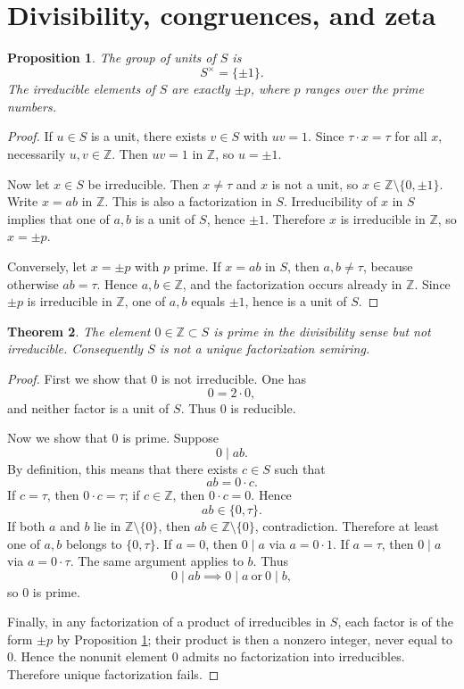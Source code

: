\documentclass[11pt]{article}
\newtheorem{theorem}{Theorem}[section]
\newtheorem{proposition}[theorem]{Proposition}
\theoremstyle{definition}
\newcommand{\Z}{\mathbb Z}
\newcommand{\taup}{\tau}
\begin{document}
\section{Divisibility, congruences, and zeta}

\begin{proposition}\label{prop:units-irr}
The group of units of \(S\) is
\[
S^{\times}=\{\pm 1\}.
\]
The irreducible elements of \(S\) are exactly \(\pm p\), where \(p\) ranges over the prime numbers.
\end{proposition}

\begin{proof}
If \(u\in S\) is a unit, there exists \(v\in S\) with \(uv=1\).  Since \(\taup\cdot x=\taup\) for all \(x\), necessarily \(u,v\in\Z\).  Then \(uv=1\) in \(\Z\), so \(u=\pm1\).

Now let \(x\in S\) be irreducible.  Then \(x\neq \taup\) and \(x\) is not a unit, so \(x\in\Z\setminus\{0,\pm1\}\).  Write \(x=ab\) in \(\Z\).  This is also a factorization in \(S\).  Irreducibility of \(x\) in \(S\) implies that one of \(a,b\) is a unit of \(S\), hence \(\pm1\).  Therefore \(x\) is irreducible in \(\Z\), so \(x=\pm p\).

Conversely, let \(x=\pm p\) with \(p\) prime.  If \(x=ab\) in \(S\), then \(a,b\neq \taup\), because otherwise \(ab=\taup\).  Hence \(a,b\in\Z\), and the factorization occurs already in \(\Z\).  Since \(\pm p\) is irreducible in \(\Z\), one of \(a,b\) equals \(\pm1\), hence is a unit of \(S\).
\end{proof}

\begin{theorem}\label{thm:zero-prime-not-irr}
The element \(0\in\Z\subset S\) is prime in the divisibility sense but not irreducible.  Consequently \(S\) is not a unique factorization semiring.
\end{theorem}

\begin{proof}
First we show that \(0\) is not irreducible.  One has
\[
0=2\cdot 0,
\]
and neither factor is a unit of \(S\).  Thus \(0\) is reducible.

Now we show that \(0\) is prime.  Suppose
\[
0\mid ab.
\]
By definition, this means that there exists \(c\in S\) such that
\[
ab=0\cdot c.
\]
If \(c=\taup\), then \(0\cdot c=\taup\); if \(c\in\Z\), then \(0\cdot c=0\).  Hence
\[
ab\in\{0,\taup\}.
\]
If both \(a\) and \(b\) lie in \(\Z\setminus\{0\}\), then \(ab\in\Z\setminus\{0\}\), contradiction.  Therefore at least one of \(a,b\) belongs to \(\{0,\taup\}\).  If \(a=0\), then \(0\mid a\) via \(a=0\cdot 1\).  If \(a=\taup\), then \(0\mid a\) via \(a=0\cdot \taup\).  The same argument applies to \(b\).  Thus
\[
0\mid ab\implies 0\mid a\ \text{or}\ 0\mid b,
\]
so \(0\) is prime.

Finally, in any factorization of a product of irreducibles in \(S\), each factor is of the form \(\pm p\) by Proposition \ref{prop:units-irr}; their product is then a nonzero integer, never equal to \(0\).  Hence the nonunit element \(0\) admits no factorization into irreducibles.  Therefore unique factorization fails.
\end{proof}
\end{document}
